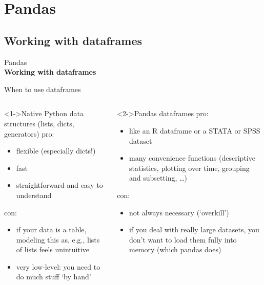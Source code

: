\documentclass[handout]{beamer}
\begin{document}
\section{Pandas}
\subsection{Working with dataframes}

\begin{frame}[plain]
	Pandas\\
	\textbf{Working with dataframes}
\end{frame}




\begin{frame}{When to use dataframes}
	\footnotesize
	\begin{columns}[t]
		
		\begin{block}<1->{Native Python data structures (lists, dicts, generators)}
		pro:
		\begin{itemize}
			\item flexible (especially dicts!)
			\item fast
			\item straightforward and easy to understand
		\end{itemize}
		con:
		\begin{itemize}
			\item if your data is a table, modeling this as, e.g., lists of lists feels unintuitive
			\item very low-level: you need to do much stuff `by hand'
		\end{itemize}
		
		\end{block}
		
		
		\begin{block}<2->{Pandas dataframes}
			pro:
			\begin{itemize}
				\item like an R dataframe or a STATA or SPSS dataset
				\item many convenience functions (descriptive statistics, plotting over time, grouping and subsetting, \ldots)
			\end{itemize}
			con:
			\begin{itemize}
				\item not always necessary (`overkill')
				\item if you deal with really large datasets, you don't want to load them fully into memory (which pandas does)
			\end{itemize}
			
		\end{block}
		
	\end{columns}
	
\end{frame}
\end{document}
